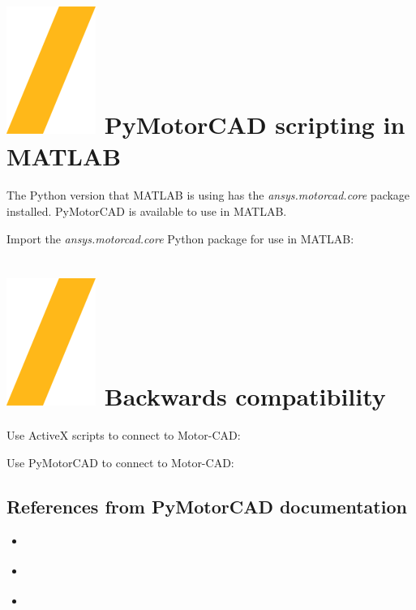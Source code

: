 \documentclass[landscape]{article}
\begin{document}
\begin{multicols}{3}
\section{\includegraphics[height=\fontcharht\font`\S]{slash.png} PyMotorCAD scripting in MATLAB}
The Python version that MATLAB is using has the \textit{ansys.motorcad.core} package installed. PyMotorCAD is available to use in MATLAB.

Import the \textit{ansys.motorcad.core} Python package for use in MATLAB:

\section{\includegraphics[height=\fontcharht\font`\S]{slash.png} Backwards compatibility}
Use ActiveX scripts to connect to Motor-CAD:

Use PyMotorCAD to connect to Motor-CAD:

\subsection{References from PyMotorCAD documentation}
\begin{center}
\begin{itemize}
\item \href{https://motorcad.docs.pyansys.com/version/stable/getting_started/index.html}{\color{blue}{Getting started}}
\item \href{https://motorcad.docs.pyansys.com/version/stable/examples/index.html}{\color{blue}{Examples}}
\item \href{https://motorcad.docs.pyansys.com/version/stable/methods/index.html}{\color{blue}{API reference}}
\end{itemize}
\end{center}
\end{multicols}
\end{document}
